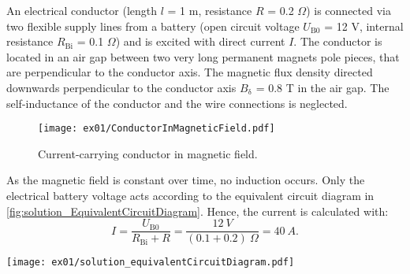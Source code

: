 

An electrical conductor (length $l$ = 1 m, resistance $R$ = 0.2 $\Omega$) is connected via two flexible supply lines from a battery (open circuit voltage $U_{\mathrm{B0}}$ = 12 V, internal resistance $R_{\mathrm{Bi}}$ = 0.1 $\Omega$) and is excited with direct current $I$. The conductor is located in an air gap between two very long permanent magnets pole pieces, that are perpendicular to the conductor axis.
The magnetic flux density directed downwards perpendicular to the conductor axis $B_{\mathrm{\updelta}}$ = 0.8 T in the air gap. The self-inductance of the conductor and the wire connections is neglected.

\begin{figure}[htb]
    \centering
    \texttt{[image: ex01/ConductorInMagneticField.pdf]}
    \caption{Current-carrying conductor in magnetic field.}
    \label{fig:ConductorInMagneticField}
\end{figure}



\begin{solutionblock}
    As the magnetic field is constant over time, no induction occurs. Only the electrical battery voltage acts according to the equivalent circuit diagram in \autoref{fig:solution_EquivalentCircuitDiagram}. Hence, the current is calculated with:
    \begin{equation}
        I = \frac{U_{\mathrm{B0}}}{R_{\mathrm{Bi}}+R}
        = \frac{12 \ \si{V}}{(0.1+0.2) \ \si{\Omega}}
        = 40 \ \si{A}.
    \end{equation}

    \begin{solutionfigure}[ht]
        \centering
        \texttt{[image: ex01/solution\_equivalentCircuitDiagram.pdf]}
        \caption{Equivalent circuit diagram for the battery and resting conductor marked here with $R$.}
        \label{fig:solution_EquivalentCircuitDiagram}
    \end{solutionfigure}

\end{solutionblock}



